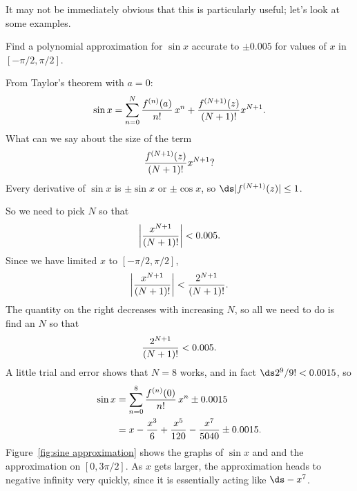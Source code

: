 It may not be immediately obvious that this is particularly useful;
let's look at some examples.

\begin{example}{}{}
Find a polynomial approximation for $\sin x$ accurate to $\pm 0.005$ for values of $x$ in $[-\pi/2,\pi/2]$. 
\end{example}
\begin{solution}
From Taylor's theorem with $a=0$:
$$
  \sin x= \sum_{n=0}^N{f^{(n)}(a)\over n!}\,x^n + 
  {f^{(N+1)}(z)\over (N+1)!}x^{N+1}.
$$
What can we say about the size of the term
$${f^{(N+1)}(z)\over (N+1)!}x^{N+1}?$$
Every derivative of $\sin x$ is $\pm\sin x$ or $\pm\cos x$, so
$\ds |f^{(N+1)}(z)|\le 1$.

So we need to pick $N$ so that 
$$\left|{x^{N+1}\over (N+1)!}\right|< 0.005.$$
Since we have limited $x$ to $[-\pi/2,\pi/2]$,
$$\left|{x^{N+1}\over (N+1)!}\right|<{2^{N+1}\over (N+1)!}.$$
The quantity on the right decreases with increasing $N$, so all we
need to do is find an $N$ so that 
$${2^{N+1}\over (N+1)!}<0.005.$$
A little trial and error shows that $N=8$ works, 
and in fact $\ds 2^{9}/9!<0.0015$, so 
\begin{align*}
  \sin x &=\sum_{n=0}^8{f^{(n)}(0)\over n!}\,x^n \pm 0.0015	\\
  &=x-{x^3\over 6}+{x^5\over 120}-{x^7\over 5040}\pm 0.0015.
\end{align*}
Figure~\ref{fig:sine approximation} shows the graphs of $\sin x$ and
and the approximation on $[0,3\pi/2]$. As $x$ gets larger, the
approximation heads to negative infinity very quickly, since it is
essentially acting like $\ds -x^7$.
\end{solution}

